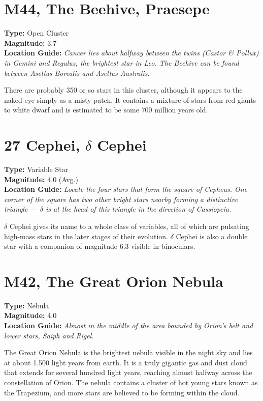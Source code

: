 \section{M44, The Beehive, Praesepe}
\textbf{Type:} Open Cluster \\
\textbf{Magnitude:} 3.7 \\ 
\textbf{Location Guide:} \textit{Cancer lies about halfway between the twins (Castor \& Pollux) in Gemini and Regulus, the brightest star in Leo. The Beehive can be found between Asellus Borealis and Asellus Australis.} 

There are probably 350 or so stars in this cluster, although it appears
to the naked eye simply as a misty patch. It contains a mixture of
stars from red giants to white dwarf and is estimated to be some 700
million years old.

\section{27 Cephei, \texorpdfstring{$\delta$}{delta} Cephei} 
\textbf{Type:} Variable Star \\
\textbf{Magnitude:} 4.0 (Avg.) \\ 
\textbf{Location Guide:} \textit{Locate the four stars that form the square of Cepheus. One corner of the square has two other bright stars nearby forming a distinctive triangle --- $\delta$ is at the head of this triangle in the direction of Cassiopeia.} 

$\delta$ Cephei gives its name to a whole class of variables, all of
which are pulsating high-mass stars in the later stages of their
evolution. $\delta$ Cephei is also a double star with a companion of
magnitude 6.3 visible in binoculars.

\section{M42, The Great Orion Nebula} 
\textbf{Type:} Nebula \\
\textbf{Magnitude:} 4.0 \\
\textbf{Location Guide:} \textit{Almost in the middle of the area bounded by Orion's belt and lower stars, Saiph and Rigel.} 

The Great Orion Nebula is the brightest nebula visible in the night
sky and lies at about 1.500 light years from earth. It is a truly
gigantic gas and dust cloud that extends for several hundred light
years, reaching almost halfway across the constellation of Orion. The
nebula contains a cluster of hot young stars known as the Trapezium,
and more stars are believed to be forming within the cloud.

